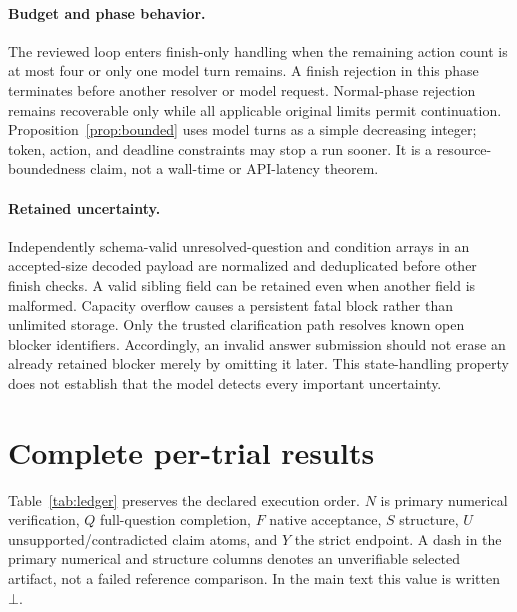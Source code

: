 \documentclass{article}
\newcommand{\botval}{\bot}
\begin{document}
\paragraph{Budget and phase behavior.} The reviewed loop enters finish-only handling when the remaining action count is at most four or only one model turn remains. A finish rejection in this phase terminates before another resolver or model request. Normal-phase rejection remains recoverable only while all applicable original limits permit continuation. Proposition~\ref{prop:bounded} uses model turns as a simple decreasing integer; token, action, and deadline constraints may stop a run sooner. It is a resource-boundedness claim, not a wall-time or API-latency theorem.

\paragraph{Retained uncertainty.} Independently schema-valid unresolved-question and condition arrays in an accepted-size decoded payload are normalized and deduplicated before other finish checks. A valid sibling field can be retained even when another field is malformed. Capacity overflow causes a persistent fatal block rather than unlimited storage. Only the trusted clarification path resolves known open blocker identifiers. Accordingly, an invalid answer submission should not erase an already retained blocker merely by omitting it later. This state-handling property does not establish that the model detects every important uncertainty.

\section{Complete per-trial results}
\label{app:ledger}
Table~\ref{tab:ledger} preserves the declared execution order. $N$ is primary numerical verification, $Q$ full-question completion, $F$ native acceptance, $S$ structure, $U$ unsupported/contradicted claim atoms, and $Y$ the strict endpoint. A dash in the primary numerical and structure columns denotes an unverifiable selected artifact, not a failed reference comparison. In the main text this value is written $\botval$.
\end{document}
